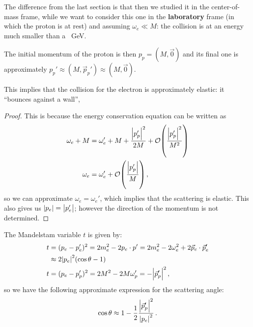 \documentclass[main.tex]{subfiles}
\begin{document}
The difference from the last section is that then we studied it in the center-of-mass frame, while we want to consider this one in the \textbf{laboratory} frame (in which the proton is at rest) and assuming \(\omega_{e} \ll M\): the collision is at an energy much smaller than a \SI{}{GeV}.

\begin{claim}
The initial momentum of the proton is then \(p_p = (M, \vec{0})\) and its final one is approximately \(p_p' \approx (M, \vec{p}_p') \approx (M, \vec{0})\).
\end{claim}



This implies that the collision for the electron is approximately elastic: it ``bounces against a wall'', 

\begin{proof}
This is because the energy conservation equation can be written as 
%
\begin{align}
\omega_{e} + M &= \omega'_e  +M + \frac{\abs{p_p'}^2}{2M}  + \order{\frac{\abs{p_p'}^2}{M^2}} \\
\omega_{e} &= \omega'_e + \order{\frac{\abs{p_p'}}{M}}
\,,
\end{align}
%
so we can approximate \(\omega_{e} = \omega_{e}'\), which implies that the scattering is elastic. This also gives us \(\abs{p_e} = \abs{p_e'}\); however the direction of the momentum is not determined. 
\end{proof}

The Mandelstam variable \(t\) is given by: 
%
\begin{align}
t &= (p_e - p_e')^2 = 2 m_e^2 - 2 p_e \cdot p' = 2 m_e^2 - 2 \omega_{e}^2 + 2 \vec{p}_e \cdot \vec{p}_e ' \\
&\approx 2 \abs{p_e}^2 \qty(\cos \theta - 1)  \\
t &= (p_e - p_p')^2 = 2 M^2 - 2 M \omega_{p}' = - \abs{\vec{p}_p'}^2
\,,
\end{align}
%
so we have the following approximate expression for the scattering angle: 
%
\begin{align}
\cos \theta \approx 1 - \frac{1}{2} \frac{\abs{\vec{p}_p'}^2}{\abs{p_e}^2}
\,.
\end{align}
\end{document}
